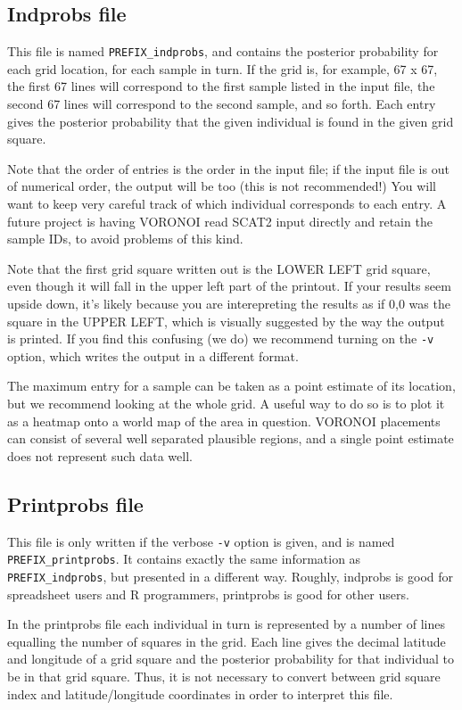 \documentclass[10pt,titlepage,times,letterpaper]{article}
\begin{document}
\subsection{Indprobs file}

This file is named {\tt PREFIX\_indprobs}, and contains the posterior probability
for each grid location, for each sample in turn. If the grid is, for example, 67 x 67,
the first 67 lines will correspond to the first sample listed in the input file,
the second 67 lines will correspond to the second sample, and so forth.  Each entry
gives the posterior probability that the given individual is found in the given
grid square.

Note that the order of entries is the order in the input file; if the input file is
out of numerical order, the output will be too (this is not recommended!)  You
will want to keep very careful track of which individual corresponds to each entry.
A future project is having VORONOI read SCAT2 input directly and retain the sample
IDs, to avoid problems of this kind.

Note that the first grid square written out is the LOWER LEFT grid square, even though
it will fall in the upper left part of the printout.  If your results seem upside
down, it's likely because you are interepreting the results as if 0,0 was the square
in the UPPER LEFT, which is visually suggested by the way the output is printed.
If you find this confusing (we do) we recommend turning on the {\tt -v} option,
which writes the output in a different format.

The maximum entry for a sample can be taken as a point estimate of its location, but
we recommend looking at the whole grid.  A useful way to do so is to plot it as a heatmap
onto a world map of the area in question.  VORONOI placements can consist of several
well separated plausible regions, and a single point estimate does not represent
such data well.

\subsection{Printprobs file}

This file is only written if the verbose {\tt -v} option is given, and is named
{\tt PREFIX\_printprobs}.  It contains exactly the same information as 
{\tt PREFIX\_indprobs}, but presented in a different way.  Roughly, indprobs is good for
spreadsheet users and R programmers, printprobs is good for other users.

In the printprobs file each individual in turn is represented by a number of lines
equalling the number of squares in the grid.  Each line gives the decimal latitude and 
longitude of a grid square and the posterior probability for that individual to be
in that grid square.  Thus, it is not necessary to convert between grid square
index and latitude/longitude coordinates in order to interpret this file.
\end{document}
